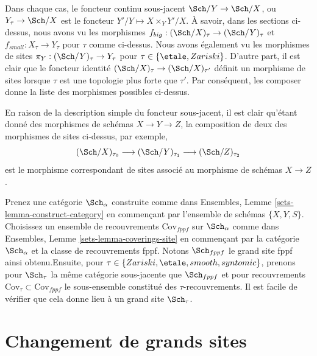 Dans chaque cas, le foncteur continu sous-jacent $\Sch/Y \to \Sch/X$, ou $Y_\tau \to \Sch/X$ est le foncteur $Y'/Y \mapsto X \times_Y Y'/X$. À savoir, dans les sections ci-dessus, nous avons vu les morphismes $f_{big} : (\Sch/X)_\tau \to (\Sch/Y)_\tau$ et $f_{small} : X_\tau \to Y_\tau$ pour $\tau$ comme ci-dessus. Nous avons également vu les morphismes de sites $\pi_Y : (\Sch/Y)_\tau \to Y_\tau$ pour $\tau \in \{\etale, Zariski\}$. D'autre part, il est clair que le foncteur identité $(\Sch/X)_\tau \to (\Sch/X)_{\tau'}$ définit un morphisme de sites lorsque $\tau$ est une topologie plus forte que $\tau'$. Par conséquent, les composer donne la liste des morphismes possibles ci-dessus.

\medskip\noindent
En raison de la description simple du foncteur sous-jacent, il est clair qu'étant donné des morphismes de schémas $X \to Y \to Z$, la composition de deux des morphismes de sites ci-dessus, par exemple,
$$
(\Sch/X)_{\tau_0} \longrightarrow
(\Sch/Y)_{\tau_1} \longrightarrow
(\Sch/Z)_{\tau_2}
$$
est le morphisme correspondant de sites associé au morphisme de schémas $X \to Z$.

\begin{remark}
\label{remark-choice-sites}
Prenez une catégorie $\Sch_\alpha$ construite comme dans Ensembles, Lemme \ref{sets-lemma-construct-category} en commençant par l'ensemble de schémas $\{X, Y, S\}$. Choisissez un ensemble de recouvrements $\text{Cov}_{fppf}$ sur $\Sch_\alpha$ comme dans Ensembles, Lemme \ref{sets-lemma-coverings-site} en commençant par la catégorie $\Sch_\alpha$ et la classe de recouvrements fppf. Notons $\Sch_{fppf}$ le grand site fppf ainsi obtenu.\newline Ensuite, pour $\tau \in \{Zariski,\allowbreak \etale,\allowbreak smooth,\allowbreak syntomic\}$, prenons pour $\Sch_\tau$ la même catégorie sous-jacente que $\Sch_{fppf}$ et pour recouvrements $\text{Cov}_\tau \subset \text{Cov}_{fppf}$ le sous-ensemble constitué des $\tau$-recouvrements. Il est facile de vérifier que cela donne lieu à un grand site $\Sch_\tau$.
\end{remark}










\section{Changement de grands sites}
\label{section-change-alpha}

